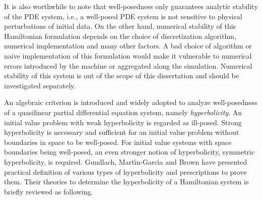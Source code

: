 It is also worthwhile to note that well-posedness only guarantees analytic stability of the PDE system, i.e., a well-posed PDE system is not sensitive to physical perturbations of initial data. On the other hand, numerical stability of this Hamiltonian formulation depends on the choice of discretization algorithm, numerical implementation and many other factors. A bad choice of algorithm or naive implementation of this formulation would make it vulnerable to numerical errors introduced by the machine or aggregated along the simulation. Numerical stability of this system is out of the scope of this dissertation and should be investigated separately. 

An algebraic criterion is introduced and widely adopted to analyze well-posedness of a quasilinear partial differential equation system, namely {\em hyperbolicity}. An initial value problem with weak hyperbolicity is regarded as ill-posed. Strong hyperbolicity is necessary and sufficient for an initial value problem without boundaries in space to be well-posed. For initial value systems with space boundaries being well-posed, an even stronger notion of hyperbolicity, symmetric hyperbolicity, is required. Gundlach, Mart\' \i n-Garc\' \i a\cite{Gundlach:2005ta} and Brown\cite{Brown:2008cca} have presented practical definition of various types of hyperbolicity and prescriptions to prove them. Their theories to determine the hyperbolicity of a Hamiltonian system is briefly reviewed as following. 

